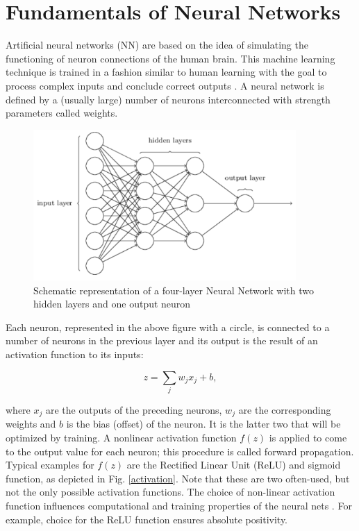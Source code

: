\section{Fundamentals of Neural Networks}
\label{sec:nn}

Artificial neural networks (NN) are based on the idea of simulating 
the functioning of neuron connections of the human brain. 
%
This machine learning technique is trained in a fashion similar to 
human learning with the goal to process complex inputs and conclude correct outputs \cite{greplova}.
%
A neural network is defined by a (usually large) number of neurons 
interconnected with strength parameters called weights. 

\begin{figure}[H]
    \centering
    \includegraphics[width=100mm]{plots/nn.png}
    \caption{Schematic representation of a four-layer Neural Network with two hidden layers and one output neuron}
    \label{fig:nn}
\end{figure}

%
Each neuron, represented in the above figure with a circle, 
is connected to a number of neurons in the previous layer and 
its output is the result of an activation function to its inputs:

\begin{equation}
    z = \sum_j w_j x_j + b,
\end{equation}

where $x_j$ are the outputs of the preceding neurons, 
$w_j$ are the corresponding weights and $b$ is the bias (offset) of the neuron. 
%
It is the latter two that will be optimized by training.
A nonlinear activation function $f(z)$ is applied to come to the output value for each neuron; 
this procedure is called forward propagation. 
%
Typical examples for $f(z)$ are the Rectified Linear Unit (ReLU) 
and sigmoid function, as depicted in Fig. \ref{activation}. 
%
Note that these are two often-used, but not the only possible activation functions. 
%
The choice of non-linear activation function influences computational and 
training properties of the neural nets \cite{juan}.
%
For example, choice for the ReLU function ensures absolute positivity. 

